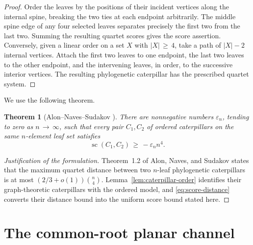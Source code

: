 \documentclass[11pt]{article}
\newtheorem{theorem}{Theorem}
\theoremstyle{definition}
\newcommand{\score}{\operatorname{sc}}
\begin{document}
\begin{proof}
Order the leaves by the positions of their incident vertices along the
internal spine, breaking the two ties at each endpoint arbitrarily.  The
middle spine edge of any four selected leaves separates precisely the
first two from the last two.  Summing the resulting quartet scores gives
the score assertion.  Conversely, given a linear order on a set $X$ with
$|X|\,\geq\,4$, take a path of $|X|-2$ internal vertices.  Attach the first
two leaves to one endpoint, the last two leaves to the other endpoint, and
the intervening leaves, in order, to the successive interior vertices.
The resulting phylogenetic caterpillar has the prescribed quartet system.
\end{proof}

We use the following theorem.

\begin{theorem}[Alon--Naves--Sudakov \cite{Alon_2016}]
\label{thm:caterpillar}
There are nonnegative numbers $\varepsilon_n$, tending to zero as
$n\,\to\,\infty$, such that every pair $C_1,C_2$ of ordered caterpillars
on the same $n$-element leaf set satisfies
\[
 \score(C_1,C_2)\,\geq\,-\varepsilon_n n^4.
\]
\end{theorem}

\begin{proof}[Justification of the formulation]
Theorem~1.2 of Alon, Naves, and Sudakov states that the maximum quartet
distance between two $n$-leaf phylogenetic caterpillars is at most
$\left(2/3+o(1)\right)\binom n4$.  Lemma~\ref{lem:caterpillar-order}
identifies their graph-theoretic caterpillars with the ordered model, and
\eqref{eq:score-distance} converts their distance bound into the uniform
score bound stated here.
\end{proof}

\section{The common-root planar channel}
\end{document}
